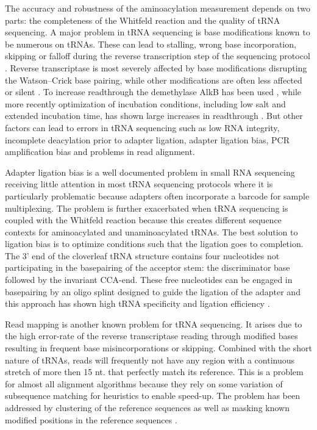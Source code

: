 \documentclass[9pt,lineno]{elife}
\begin{document}
The accuracy and robustness of the aminoacylation measurement depends on two parts: the completeness of the Whitfeld reaction and the quality of tRNA sequencing.
A major problem in tRNA sequencing is base modifications known to be numerous on tRNAs.
These can lead to stalling, wrong base incorporation, skipping or falloff during the reverse transcription step of the sequencing protocol \citep{Motorin2007-nb}.
Reverse transcriptase is most severely affected by base modifications disrupting the Watson–Crick base pairing, while other modifications are often less affected or silent \citep{Wang2021-fc}.
To increase readthrough the demethylase AlkB has been used \citep{Zheng2015-kj}, while more recently optimization of incubation conditions, including low salt and extended incubation time, has shown large increases in readthrough \citep{Behrens2021-gb}.
But other factors can lead to errors in tRNA sequencing such as low RNA integrity, incomplete deacylation prior to adapter ligation, adapter ligation bias, PCR amplification bias and problems in read alignment.

Adapter ligation bias is a well documented problem in small RNA sequencing \citep{Fuchs2015-nb, Zhuang2012-nu} receiving little attention in most tRNA sequencing protocols where it is particularly problematic because adapters often incorporate a barcode for sample multiplexing.
The problem is further exacerbated when tRNA sequencing is coupled with the Whitfeld reaction because this creates different sequence contexts for aminoacylated and unaminoacylated tRNAs.
The best solution to ligation bias is to optimize conditions such that the ligation goes to completion.
The 3' end of the cloverleaf tRNA structure contains four nucleotides not participating in the basepairing of the acceptor stem: the discriminator base followed by the invariant CCA-end.
These free nucleotides can be engaged in basepairing by an oligo splint designed to guide the ligation of the adapter and this approach has shown high tRNA specificity and ligation efficiency \cite{Shigematsu2017-tv, Smith2015-ht}.

Read mapping is another known problem for tRNA sequencing.
It arises due to the high error-rate of the reverse transcriptase reading through modified bases resulting in frequent base misincorporations or skipping.
Combined with the short nature of tRNAs, reads will frequently not have any region with a continuous stretch of more then 15 nt. that perfectly match its reference.
This is a problem for almost all alignment algorithms because they rely on some variation of subsequence matching for heuristics to enable speed-up.
The problem has been addressed by clustering of the reference sequences \citep{Hoffmann2018-uz} as well as masking known modified positions in the reference sequences \citep{Behrens2021-gb}.
\end{document}
